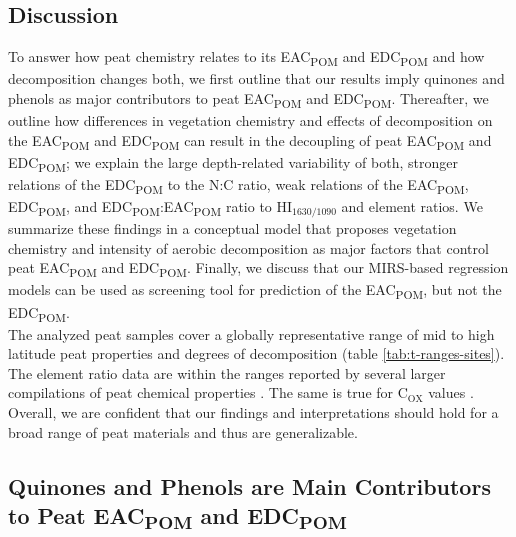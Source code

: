 \documentclass[alpha-refs]{wiley-article-rmd}
\begin{document}
\begin{refsection}
\hypertarget{discussion}{%
\section{Discussion}\label{discussion}}

To answer how peat chemistry relates to its EAC\textsubscript{POM} and EDC\textsubscript{POM} and how decomposition changes both, we first outline that our results imply quinones and phenols as major contributors to peat EAC\textsubscript{POM} and EDC\textsubscript{POM}. Thereafter, we outline how differences in vegetation chemistry and effects of decomposition on the EAC\textsubscript{POM} and EDC\textsubscript{POM} can result in the decoupling of peat EAC\textsubscript{POM} and EDC\textsubscript{POM}; we explain the large depth-related variability of both, stronger relations of the EDC\textsubscript{POM} to the N:C ratio, weak relations of the EAC\textsubscript{POM}, EDC\textsubscript{POM}, and EDC\textsubscript{POM}:EAC\textsubscript{POM} ratio to HI\(_\text{1630/1090}\) and element ratios. We summarize these findings in a conceptual model that proposes vegetation chemistry and intensity of aerobic decomposition as major factors that control peat EAC\textsubscript{POM} and EDC\textsubscript{POM}.
Finally, we discuss that our MIRS-based regression models can be used as screening tool for prediction of the EAC\textsubscript{POM}, but not the EDC\textsubscript{POM}.\\
The analyzed peat samples cover a globally representative range of mid to high latitude peat properties and degrees of decomposition (table \ref{tab:t-ranges-sites}).
The element ratio data are within the ranges reported by several larger compilations of peat chemical properties \autocite{Moore.2018,Leifeld.2020,Wang.2015b,Loisel.2014,Tipping.2016}. The same is true for C\(_\textrm{OX}\) values \autocite{Worrall.2016b,Moore.2018,Leifeld.2020}. Overall, we are confident that our findings and interpretations should hold for a broad range of peat materials and thus are generalizable.

\hypertarget{quinones-and-phenols-are-main-contributors-to-peat-eac-and-edc}{%
\subsection{\texorpdfstring{Quinones and Phenols are Main Contributors to Peat EAC\textsubscript{POM} and EDC\textsubscript{POM}}{Quinones and Phenols are Main Contributors to Peat EAC and EDC}}\label{quinones-and-phenols-are-main-contributors-to-peat-eac-and-edc}}


\end{refsection}
\end{document}
